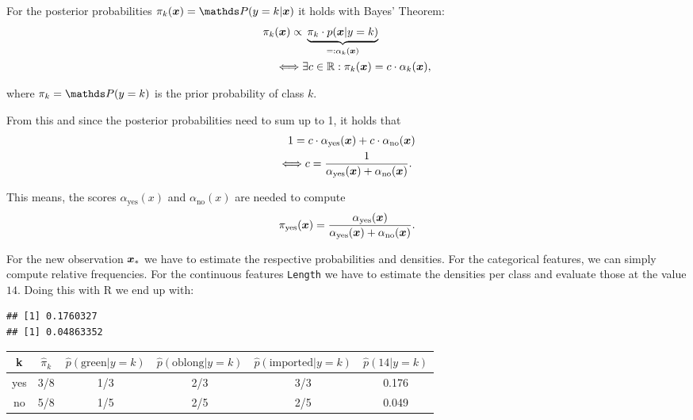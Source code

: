 \documentclass[a4paper]{article}
\makeatletter
\newenvironment{kframe}{%
 \def\at@end@of@kframe{}%
 \ifinner\ifhmode%
  \def\at@end@of@kframe{\end{minipage}}%
  \begin{minipage}{\columnwidth}%
 \fi\fi%
 \def\FrameCommand##1{\hskip\@totalleftmargin \hskip-\fboxsep
 \colorbox{shadecolor}{##1}\hskip-\fboxsep
     \hskip-\linewidth \hskip-\@totalleftmargin \hskip\columnwidth}%
 \MakeFramed {\advance\hsize-\width
   \@totalleftmargin\z@ \linewidth\hsize
   \@setminipage}}%
 {\par\unskip\endMakeFramed%
 \at@end@of@kframe}
\newenvironment{knitrout}{}{} %
\makeatother
\begin{document}
{{\begin{enumerate}
  For the posterior probabilities $\pi_k(\xv) = \P(y = k | \xv)$ it holds with
  Bayes' Theorem:
  \begin{align*}
  \pi_k(\bm{x})  \propto & \; \underbrace{\pi_k \cdot p(\bm{x}|y = k)
  }_{=: \alpha_k(\bm{x})} \\
  \iff & \exists c \in \mathbb{R}: \pi_k(\bm{x}) = c \cdot \alpha_k(\bm{x}),
  \end{align*}

  where $\pi_k = \P(y = k)$ is the prior probability of class $k$.

  From this and since the posterior probabilities need to sum up to 1, it holds
  that
  \begin{align*}1 =& \; c \cdot \alpha_\text{yes}(\bm{x}) +  c \cdot
  \alpha_\text{no}(\bm{x}) \\
  \iff & c = \frac{1}{\alpha_\text{yes}(\bm{x}) + \alpha_\text{no}(\bm{x})}.
  \end{align*}

  This means, the scores $\alpha_\text{yes}(x)$ and $\alpha_\text{no}(x)$ are
  needed to compute  $$\pi_\text{yes}(\bm{x}) = \frac{\alpha_\text{yes}(\bm{x})}{
  \alpha_\text{yes}(\bm{x}) + \alpha_\text{no}(\bm{x})}. $$

  For the new observation $\bm{x}_*$ we have to estimate the respective
  probabilities and densities. For the categorical features, we can simply
  compute relative frequencies. For the continuous features \texttt{Length} we
  have to estimate the densities per class and evaluate those at the value $14$.
  Doing this with R we end up with:

\begin{knitrout}
\color{fgcolor}\begin{kframe}
\begin{verbatim}
## [1] 0.1760327
## [1] 0.04863352
\end{verbatim}
\end{kframe}
\end{knitrout}

  \begin{center}
  \begin{tabular}{ | c | c | c | c | c | c |}
  \hline
  k     &  $\hat{\pi}_k$   &  $\hat{p}(\text{green}|y = k)$    &  
  $\hat{p}(\text{oblong}|y = k)$    & $\hat{p}(\text{imported}|y = k)$    & 
  $\hat{p}(\text{14}|y = k)$   \\  \hline
  yes   &  3/8  &  1/3    &  2/3  & 3/3     &  0.176 \\
  no    &  5/8  &  1/5    &  2/5  & 2/5     &  0.049 \\
  \hline
  \end{tabular}
  \end{center}


\end{enumerate}}}
\end{document}
